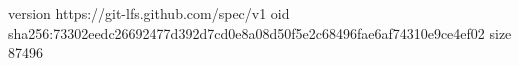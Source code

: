 version https://git-lfs.github.com/spec/v1
oid sha256:73302eedc26692477d392d7cd0e8a08d50f5e2c68496fae6af74310e9ce4ef02
size 87496
